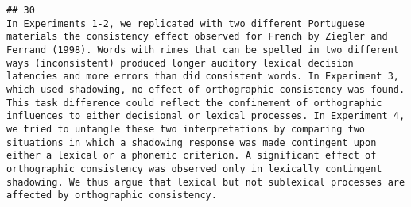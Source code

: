\documentclass[
  english,
  man]{apa6}
\begin{document}
\begin{verbatim}
## 30                                                                                                                                                                                                                                                                                                                                                                                                                                                                                                                                                                                                                                                                                                                                                                                                                                                                                                                                                                                                                                                                                                                                                                                                                                                                                                                                                                                                                                                                                                                                                                                                                                                                                                                        In Experiments 1-2, we replicated with two different Portuguese materials the consistency effect observed for French by Ziegler and Ferrand (1998). Words with rimes that can be spelled in two different ways (inconsistent) produced longer auditory lexical decision latencies and more errors than did consistent words. In Experiment 3, which used shadowing, no effect of orthographic consistency was found. This task difference could reflect the confinement of orthographic influences to either decisional or lexical processes. In Experiment 4, we tried to untangle these two interpretations by comparing two situations in which a shadowing response was made contingent upon either a lexical or a phonemic criterion. A significant effect of orthographic consistency was observed only in lexically contingent shadowing. We thus argue that lexical but not sublexical processes are affected by orthographic consistency.

\end{verbatim}
\end{document}
